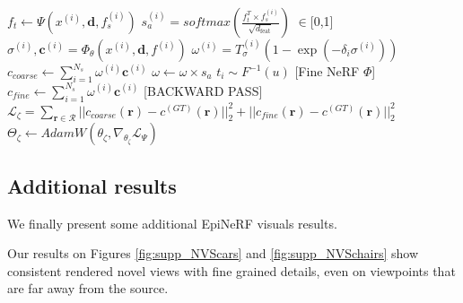 \begin{algorithm}[htp!]
{{        $f_{t} \gets \Psi(x^{(i)},\mathbf{d},f_{s}^{(i)})$ 
        $s_{a}^{(i)} = softmax\left(\frac{f_{t}^{T}\times f_{s}^{(i)}}{\sqrt{d_{\text{feat}}}}\right)$\textcolor{gray!80}{ $\in$[0,1]} 
        $\sigma^{(i)},\mathbf{c}^{(i)} = \Phi_{\theta}(x^{(i)},\mathbf{d},f^{(i)})$ 
        $\omega^{(i)} = T_{\sigma}^{(i)}(1-\exp(-\delta_{i}\sigma^{(i)}))$ 
        }
        \;
        $c_{coarse} \gets \sum_{i=1}^{N_{s}}\omega^{(i)}\textbf{c}^{(i)}$ 
        $\omega \gets \omega \times s_{a}$ 
        $t_{i}\sim F^{-1}(u)$ 
        \;
        \textcolor{orange!50}{[Fine NeRF $\Phi$]}\;
        $c_{fine} \gets \sum_{i=1}^{N_{s}}\omega^{(i)}\textbf{c}^{(i)}$ 
  \;
  \textcolor{red!50}{[BACKWARD PASS]}\;
    $\mathcal{L}_{\zeta}= \sum_{\mathbf{r}\in\mathcal{R}} || c_{coarse}(\mathbf{r}) - c^{(GT)}(\mathbf{r}) ||_{2}^{2} +|| c_{fine}(\mathbf{r}) - c^{(GT)}(\mathbf{r}) ||_{2}^{2}$
    $\Theta_{\zeta} \gets AdamW(\theta_{\zeta},\nabla_{\theta_{\zeta}} \mathcal{L}_{\Psi})$ 
    }
\end{algorithm}

\subsection{Additional results}

We finally present some additional EpiNeRF visuals results. 

Our results on Figures \ref{fig:supp_NVScars} and \ref{fig:supp_NVSchairs} show consistent rendered novel views with fine grained details, even on viewpoints that are far away from the source. 

